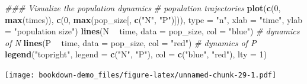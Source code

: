 \documentclass[
]{book}
\newenvironment{Shaded}{\begin{snugshade}}{\end{snugshade}}
\newcommand{\CommentTok}[1]{\textcolor[rgb]{0.56,0.35,0.01}{\textit{#1}}}
\newcommand{\DataTypeTok}[1]{\textcolor[rgb]{0.13,0.29,0.53}{#1}}
\newcommand{\DecValTok}[1]{\textcolor[rgb]{0.00,0.00,0.81}{#1}}
\newcommand{\KeywordTok}[1]{\textcolor[rgb]{0.13,0.29,0.53}{\textbf{#1}}}
\newcommand{\NormalTok}[1]{#1}
\newcommand{\OperatorTok}[1]{\textcolor[rgb]{0.81,0.36,0.00}{\textbf{#1}}}
\newcommand{\StringTok}[1]{\textcolor[rgb]{0.31,0.60,0.02}{#1}}
\begin{document}
\begin{Shaded}
\begin{Highlighting}[]
\CommentTok{### Visualize the population dynamics}
\CommentTok{# population trajectories}
\KeywordTok{plot}\NormalTok{(}\KeywordTok{c}\NormalTok{(}\DecValTok{0}\NormalTok{, }\KeywordTok{max}\NormalTok{(times)), }\KeywordTok{c}\NormalTok{(}\DecValTok{0}\NormalTok{, }\KeywordTok{max}\NormalTok{(pop_size[, }\KeywordTok{c}\NormalTok{(}\StringTok{"N"}\NormalTok{, }\StringTok{"P"}\NormalTok{)])), }\DataTypeTok{type =} \StringTok{"n"}\NormalTok{, }\DataTypeTok{xlab =} \StringTok{"time"}\NormalTok{, }\DataTypeTok{ylab =} \StringTok{"population size"}\NormalTok{)}
\KeywordTok{lines}\NormalTok{(N }\OperatorTok{~}\StringTok{ }\NormalTok{time, }\DataTypeTok{data =}\NormalTok{ pop_size, }\DataTypeTok{col =} \StringTok{"blue"}\NormalTok{) }\CommentTok{# dynamics of N}
\KeywordTok{lines}\NormalTok{(P }\OperatorTok{~}\StringTok{ }\NormalTok{time, }\DataTypeTok{data =}\NormalTok{ pop_size, }\DataTypeTok{col =} \StringTok{"red"}\NormalTok{) }\CommentTok{# dynamics of P}
\KeywordTok{legend}\NormalTok{(}\StringTok{"topright"}\NormalTok{, }\DataTypeTok{legend =} \KeywordTok{c}\NormalTok{(}\StringTok{"N"}\NormalTok{, }\StringTok{"P"}\NormalTok{), }\DataTypeTok{col =} \KeywordTok{c}\NormalTok{(}\StringTok{"blue"}\NormalTok{, }\StringTok{"red"}\NormalTok{), }\DataTypeTok{lty =} \DecValTok{1}\NormalTok{)}
\end{Highlighting}
\end{Shaded}

\texttt{[image: bookdown-demo\_files/figure-latex/unnamed-chunk-29-1.pdf]}
\end{document}
